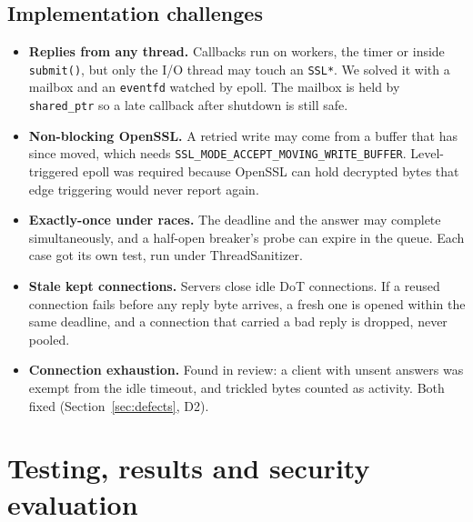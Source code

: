 \documentclass[11pt,a4paper]{article}
\newcommand{\code}[1]{\texttt{#1}}
\begin{document}
\subsection{Implementation challenges}
\begin{itemize}
  \item \textbf{Replies from any thread.} Callbacks run on workers, the timer or inside \code{submit()}, but only
  the I/O thread may touch an \code{SSL*}. We solved it with a mailbox and an \code{eventfd} watched by epoll.
  The mailbox is held by \code{shared\_ptr} so a late callback after shutdown is still safe.
  \item \textbf{Non-blocking OpenSSL.} A retried write may come from a buffer that has
  since moved, which needs \code{SSL\_MODE\_ACCEPT\_\allowbreak MOVING\_\allowbreak WRITE\_\allowbreak BUFFER}. Level-triggered epoll was required because OpenSSL can hold
  decrypted bytes that edge triggering would never report again.
  \item \textbf{Exactly-once under races.} The deadline and the answer may complete simultaneously, and a
  half-open breaker's probe can expire in the queue. Each case got its own test, run under ThreadSanitizer.
  \item \textbf{Stale kept connections.} Servers close idle DoT connections. If a reused connection fails before
  any reply byte arrives, a fresh one is opened within the same deadline, and a connection that carried a bad
  reply is dropped, never pooled.
  \item \textbf{Connection exhaustion.} Found in review: a client with unsent answers was exempt from the idle
  timeout, and trickled bytes counted as activity. Both fixed (Section~\ref{sec:defects}, D2).
\end{itemize}

\section{Testing, results and security evaluation}
\end{document}
